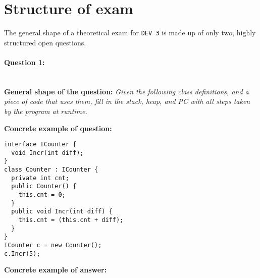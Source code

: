 \section*{Structure of exam \modulecode}
The general shape of a theoretical exam for \texttt{DEV 3} is made up of only two, highly structured open questions.

\paragraph{Question 1: } \ \\

\textbf{General shape of the question:} \textit{Given the following class definitions, and a piece of code that uses them, fill in the stack, heap, and PC with all steps taken by the program at runtime.}

\textbf{Concrete example of question:}

\lstset{numbers=left,basicstyle=\ttfamily\small}\lstset{language=[Sharp]C}
\begin{lstlisting}
interface ICounter {
  void Incr(int diff);
}
class Counter : ICounter {
  private int cnt;
  public Counter() {
    this.cnt = 0;
  }
  public void Incr(int diff) {
    this.cnt = (this.cnt + diff);
  }
}
ICounter c = new Counter();
c.Incr(5);
\end{lstlisting}

\textbf{Concrete example of answer:}

